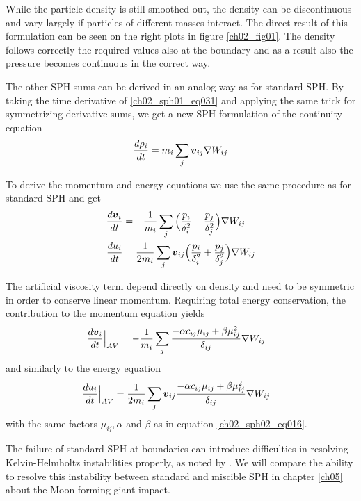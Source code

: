 While the particle density is still smoothed out, the density can be discontinuous and vary largely if particles of different masses interact. The direct result of this formulation can be seen on the right plots in figure \ref{ch02_fig01}. The density follows correctly the required values also at the boundary and as a result also the pressure becomes continuous in the correct way.

The other SPH sums can be derived in an analog way as for standard SPH. By taking the time derivative of \ref{ch02_sph01_eq031} and applying the same trick for symmetrizing derivative sums, we get a new SPH formulation of the continuity equation 
\begin{equation}
\label{ch02_sph01_eq032}
\frac{d \rho_i}{dt} = m_i \sum_j \boldsymbol{v}_{ij} \nabla W_{ij}
\end{equation}

To derive the momentum and energy equations we use the same procedure as for standard SPH and get 
\begin{align}
\label{ch02_sph01_eq033}
\frac{d \boldsymbol{v}_i }{dt} &= - \frac{1}{m_i}  \sum_{j} \Big( \frac{p_i}{\delta_i^2} + \frac{p_j}{\delta_j^2} \Big) \nabla W_{ij} \\
\frac{du_i}{dt} &= \frac{1}{2 m_i}  \sum_{j} \boldsymbol{v}_{ij} \Big( \frac{p_i}{\delta_i^2}  + \frac{p_j}{\delta_j^2} \Big)  \nabla W_{ij} 
\end{align}

The artificial viscosity term depend directly on density and need to be symmetric in order to conserve linear momentum. Requiring total energy conservation, the contribution to the momentum equation yields
\begin{align}
\label{ch02_sph01_eq034}
\frac{d \boldsymbol{v}_i }{dt} \Big|_{AV} = - \frac{1}{m_i} & \sum_{j} \frac{- \alpha c_{ij} \mu_{ij} +  \beta \mu_{ij}^2 }{\delta_{ij} } \nabla W_{ij}
\end{align}
and similarly to the energy equation
\begin{align}
\label{ch02_sph01_eq035}
\frac{du_i}{dt}  \Big|_{AV} = \frac{1}{2 m_i} & \sum_{j} \boldsymbol{v}_{ij} \frac{- \alpha c_{ij} \mu_{ij} +  \beta \mu_{ij}^2 }{\delta_{ij} } \nabla W_{ij}
\end{align}
with the same factors $\mu_{ij}, \alpha$ and $\beta$ as in equation \ref{ch02_sph02_eq016}. 

The failure of standard SPH at boundaries can introduce difficulties in resolving Kelvin-Helmholtz instabilities properly, as noted by \cite{Agertz:2006p1552}. We will compare the ability to resolve this instability between standard and miscible SPH in chapter \ref{ch05} about the Moon-forming giant impact.

